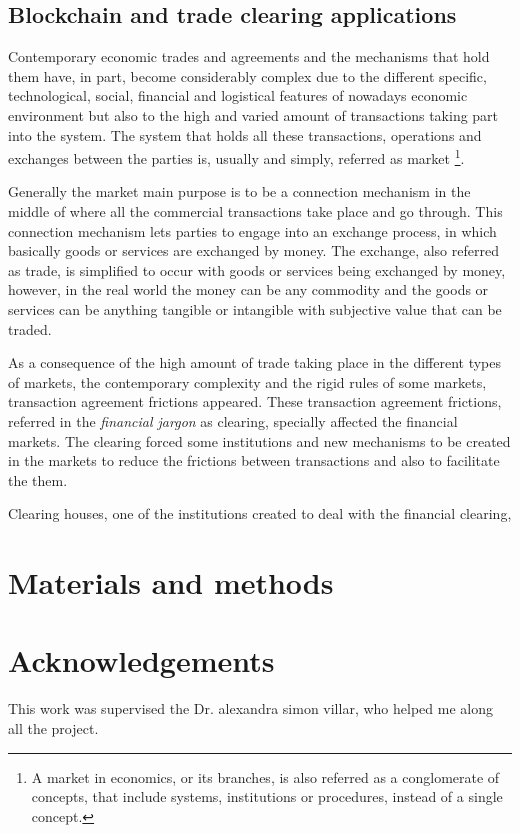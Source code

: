\documentclass[12pt]{article}
\begin{document}
\begin{multicols}{2}
\subsection{Blockchain and trade clearing applications}
Contemporary economic trades and agreements and the mechanisms that hold them have, in part, become considerably complex due to the different specific, technological, social, financial and logistical features of nowadays economic environment but also to the high and varied  amount of transactions taking part into the system. The system that holds all these transactions, operations and exchanges between the parties is, usually and simply, referred as market \footnote{A market in economics, or its branches, is also referred as a conglomerate of concepts, that include systems, institutions or procedures, instead of a single concept.}. 

Generally the market main purpose is to be a connection mechanism in the middle of where all the commercial transactions take place and go through. This connection mechanism lets parties to engage into an exchange process, in which basically goods or services are exchanged by money. The exchange, also referred as trade, is simplified to occur with goods or services being exchanged by money, however, in the real world the money can be any commodity and the goods or services can be anything tangible or intangible with subjective value that can be traded.   

As a consequence of the high amount of trade taking place in the different types of markets, the contemporary complexity and the rigid rules of some markets, transaction agreement frictions appeared. These transaction agreement frictions, referred in the \emph{financial jargon} as clearing, specially affected the financial markets. The clearing forced some institutions and new mechanisms to be created in the markets to reduce the frictions between transactions and also to facilitate the them. 

Clearing houses, one of the institutions created to deal with the financial clearing,
\section{Materials and methods}
\section{Acknowledgements}
This work was supervised the Dr. alexandra simon villar, who helped me along all the project.
\printbibliography %
\end{multicols}
\end{document}
